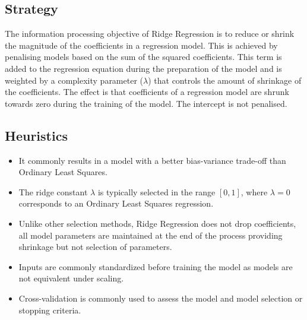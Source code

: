 \subsection{Strategy}
The information processing objective of Ridge Regression is to reduce or shrink the magnitude of the coefficients in a regression model.
This is achieved by penalising models based on the sum of the squared coefficients. This term is added to the regression equation during the preparation of the model and is weighted by a complexity parameter ($\lambda$) that controls the amount of shrinkage of the coefficients. 
The effect is that coefficients of a regression model are shrunk towards zero during the training of the model. The intercept is not penalised.

\subsection{Heuristics}

\begin{itemize}
	\item It commonly results in a model with a better bias-variance trade-off than Ordinary Least Squares.
	\item The ridge constant $\lambda$ is typically selected in the range $[0,1]$, where $\lambda=0$ corresponds to an Ordinary Least Squares regression.
	\item Unlike other selection methods, Ridge Regression does not drop coefficients, all model parameters are maintained at the end of the process providing shrinkage but not selection of parameters.
	\item Inputs are commonly standardized before training the model as models are not equivalent under scaling.
	\item Cross-validation is commonly used to assess the model and model selection or stopping criteria.
\end{itemize}

